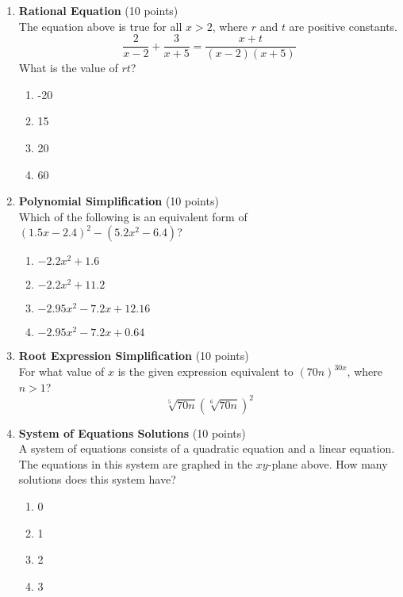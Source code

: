 \begin{enumerate}
  \item \textbf{Rational Equation} (10 points)\\
  The equation above is true for all $x>2$, where $r$ and $t$ are positive constants.
  \[
  \frac{2}{x-2}+\frac{3}{x+5}=\frac{x+t}{(x-2)(x+5)}
  \]
  What is the value of $r t$?
  \begin{enumerate}[label=(\Alph*)]
    \item -20
    \item 15
    \item 20
    \item 60
  \end{enumerate}
  \begin{subanswer}
  \end{subanswer}

  \item \textbf{Polynomial Simplification} (10 points)\\
  Which of the following is an equivalent form of $(1.5 x-2.4)^{2}-\left(5.2 x^{2}-6.4\right)$?
  \begin{enumerate}[label=(\Alph*)]
    \item $-2.2 x^{2}+1.6$
    \item $-2.2 x^{2}+11.2$
    \item $-2.95 x^{2}-7.2 x+12.16$
    \item $-2.95 x^{2}-7.2 x+0.64$
  \end{enumerate}
  \begin{subanswer}
  \end{subanswer}

  \item \textbf{Root Expression Simplification} (10 points)\\
  For what value of $x$ is the given expression equivalent to $(70 n)^{30 x}$, where $n>1$?
  \[
  \sqrt[5]{70 n}(\sqrt[6]{70 n})^{2}
  \]
  \begin{subanswer}
  \end{subanswer}

  \newpage

  \item \textbf{System of Equations Solutions} (10 points)\\
  A system of equations consists of a quadratic equation and a linear equation. The equations in this system are graphed in the $xy$-plane above. How many solutions does this system have?
  \begin{enumerate}[label=(\Alph*)]
    \item 0
    \item 1
    \item 2
    \item 3
  \end{enumerate}
  \begin{subanswer}
  \end{subanswer}


\end{enumerate}

